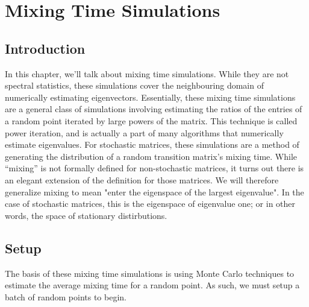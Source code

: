 \chapter{Mixing Time Simulations}
\section{Introduction}
In this chapter, we'll talk about mixing time simulations.
While they are not spectral statistics, these simulations cover the neighbouring domain of numerically estimating eigenvectors.
Essentially, these mixing time simulations are a general class of simulations involving estimating the ratios of the entries of a
random point iterated by large powers of the matrix. This technique is called power iteration, and is actually a part of many algorithms that numerically estimate eigenvalues.
For stochastic matrices, these simulations are a method of generating the distribution of a random transition matrix's mixing time.
While ``mixing'' is not formally defined for non-stochastic matrices, it turns out there is an elegant extension of the definition for those matrices.
We will therefore generalize mixing to mean "enter the eigenspace of the largest eigenvalue". In the case of stochastic matrices,
this is the eigenspace of eigenvalue one; or in other words, the space of stationary distirbutions.



\section{Setup}


The basis of these mixing time simulations is using Monte Carlo techniques to estimate the average mixing time for a random point. As such, we must setup a batch of random points to begin.


